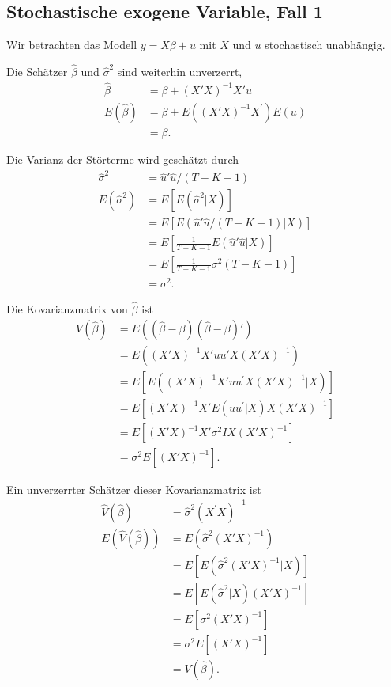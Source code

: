 \documentclass{article}
\begin{document}
\subsection*{Stochastische exogene Variable, Fall 1}

Wir betrachten das Modell $y=X\beta+u$ mit $X$ und $u$ stochastisch 
unabhängig.

Die Schätzer $\hat{\beta}$ und $\hat{\sigma}^{2}$ sind weiterhin unverzerrt,
\begin{align*}
\hat\beta &=\beta +(X'X)^{-1}X'u \\
E(\hat\beta) &=\beta +E\left( \left( X'X\right) ^{-1}X^{\prime}\right) E\left( u\right) \\
&=\beta.
\end{align*}

Die Varianz der Störterme wird geschätzt durch
\begin{align*}
\hat{\sigma}^{2} &=\hat{u}'\hat{u}/(T-K-1) \\
E(\hat{\sigma}^{2}) &=E\left[ E\left( \hat{\sigma}^{2}|X\right) \right] \\
&=E\left[ E\left( \hat{u}'\hat{u}/(T-K-1)|X\right) \right] \\
&=E\left[ \frac{1}{T-K-1}E\left( \hat{u}'\hat{u}|X\right) \right]\\
&=E\left[ \frac{1}{T-K-1}\sigma ^{2}\left( T-K-1\right) \right] \\
&=\sigma^2.
\end{align*}

Die Kovarianzmatrix von $\hat\beta$ ist
\begin{align*}
V(\hat\beta) &=E\left( \left( \hat\beta-\beta \right) \left( \hat\beta-\beta \right) '\right) \\
&=E\left( \left( X'X\right) ^{-1}X'uu'X\left(X'X\right) ^{-1}\right) \\
&=E\left[ E\left( \left( X'X\right) ^{-1}X'uu^{\prime}X\left( X'X\right) ^{-1}|X\right) \right] \\
&=E\left[ \left( X'X\right) ^{-1}X'E\left( uu^{\prime}|X\right) X\left( X'X\right) ^{-1}\right] \\
&=E\left[ \left( X'X\right) ^{-1}X'\sigma ^{2}IX\left(X'X\right) ^{-1}\right] \\
&=\sigma ^{2}E\left[ \left( X'X\right) ^{-1}\right].
\end{align*}

Ein unverzerrter Schätzer dieser Kovarianzmatrix ist
\begin{align*}
\hat{V}(\hat\beta) &=\hat{\sigma}^{2}\left( X^{\prime}X\right) ^{-1} \\
E(\hat{V}(\hat\beta)) &=E\left( \hat{\sigma}^{2}\left( X'X\right) ^{-1}\right) \\
&=E\left[ E\left( \hat{\sigma}^{2}\left( X'X\right) ^{-1}|X\right) \right] \\
&=E\left[ E\left( \hat{\sigma}^{2}|X\right) \left( X'X\right) ^{-1}\right] \\
&=E\left[ \sigma ^{2}\left( X'X\right) ^{-1}\right] \\
&=\sigma ^{2}E\left[ \left( X'X\right) ^{-1}\right] \\
&=V(\hat\beta).
\end{align*}
\end{document}
